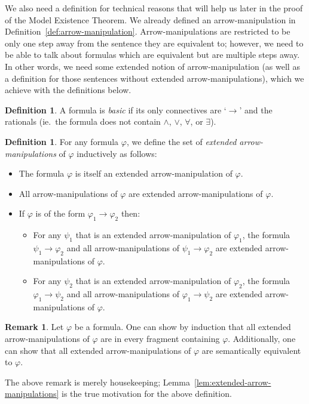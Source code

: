 \documentclass{amsart}
\theoremstyle{definition}
\newtheorem{remark}[theorem]{Remark}
\newtheorem{definition}[theorem]{Definition}
\numberwithin{equation}{theorem}
\renewcommand{\phi}{\varphi}
\newcommand{\unvee}{{\vee}}
\newcommand{\unwedge}{{\wedge}}
\newcommand{\narrow}[1]{\xrightarrow{#1}}
\renewcommand{\to}{\narrow{}}
\begin{document}
We also need a definition for technical reasons that will help us later in the proof of the Model Existence Theorem.
We already defined an arrow-manipulation in Definition~\ref{def:arrow-manipulation}.
Arrow-manipulations are restricted to be only one step away from the sentence they are equivalent to; however, we need to be able to talk about formulas which are equivalent but are multiple steps away.
In other words, we need some extended notion of arrow-manipulation (as well as a definition for those sentences without extended arrow-manipulations), which we achieve with the definitions below.
\begin{definition}
  A formula is \emph{basic} if its only connectives are `$\to$' and the rationals (ie.\ the formula does not contain $\unwedge$, $\unvee$, $\forall$, or $\exists$).
\end{definition}
\begin{definition}
	For any formula $\phi$, we define the set of \emph{extended arrow-manipulations} of $\phi$ inductively as follows:
  \begin{itemize}
    \item The formula $\phi$ is itself an extended arrow-manipulation of $\phi$.
    \item All arrow-manipulations of $\phi$ are extended arrow-manipulations of $\phi$.
    \item If $\phi$ is of the form $\phi_1\to\phi_2$ then:
    \begin{itemize}
      \item 
        For any $\psi_1$ that is an extended arrow-manipulation of $\phi_1$, the formula $\psi_1\to\phi_2$ and all arrow-manipulations of $\psi_1\to\phi_2$ are extended arrow-manipulations of $\phi$.
      \item 
        For any $\psi_2$ that is an extended arrow-manipulation of $\phi_2$, the formula $\phi_1\to\psi_2$ and all arrow-manipulations of $\phi_1\to\psi_2$ are extended arrow-manipulations of $\phi$.
    \end{itemize}
  \end{itemize}
\end{definition}
\begin{remark}
  Let $\phi$ be a formula.
  One can show by induction that all extended arrow-manipulations of $\phi$ are in every fragment containing $\phi$.
  Additionally, one can show that all extended arrow-manipulations of $\phi$ are semantically equivalent to $\phi$.
\end{remark}
The above remark is merely housekeeping; Lemma~\ref{lem:extended-arrow-manipulations} is the true motivation for the above definition.
\end{document}
